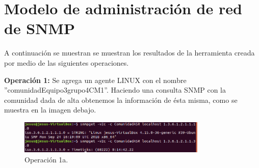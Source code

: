 \section{Modelo de administración de red de SNMP}

\noindent
A continuación se muestran se muestran los resultados de la herramienta creada por medio de las siguientes operaciones.

\noindent
\newline
\textbf{Operación 1:} Se agrega un agente LINUX con el nombre ''comunidadEquipo3grupo4CM1''. Haciendo una consulta SNMP con la comunidad dada de alta obtenemos la información de ésta misma, como se muestra en la imagen debajo.  
 
\begin{figure}[htbp!]
	\centering
		\includegraphics[width=0.8\textwidth]{images/tarea3/op1}
	\caption{Operación 1a.}
\end{figure}